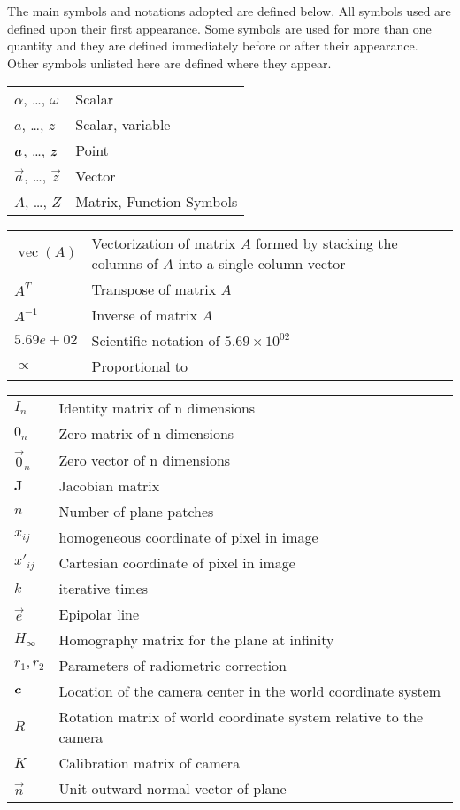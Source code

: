 
The main symbols and notations adopted are defined below. All symbols used are defined upon their first appearance. Some symbols are used for more than one quantity and they are defined immediately before or after their appearance. Other symbols unlisted here are defined where they appear.
 

\begin{tabular}{p{1.5cm} p{12cm}}
$\alpha$, \dots, $\omega$ & Scalar \\
$a$, \dots, $z$ & Scalar, variable\\
$\boldsymbol{a}$, \dots, $\boldsymbol{z}$ & Point \\
$\vec{a}$, \dots, $\vec{z}$ & Vector \\
$A$, \dots, $Z$ & Matrix, Function Symbols\\
\end{tabular}


\begin{tabular}{p{1.5cm} p{12cm}}
	$\operatorname {vec}(A)$ &  Vectorization of matrix $A$ formed by stacking the columns of $A$ into a single column vector\\
	$A^T$ &Transpose of matrix $A$ \\
	$A^{-1}$ & Inverse of matrix $A$\\
	$5.69e+02 $ & Scientific notation of $5.69 \times 10^{02}$\\
	$\propto $ & Proportional to
\end{tabular}


\begin{tabular}{p{1.5cm} p{12cm}}
$I_n$ & Identity matrix of n dimensions \\
$0_n$ & Zero matrix of n dimensions\\
$\vec{0}_{n}$ & Zero vector of n dimensions\\
$ \mathbf{J}$ & Jacobian matrix\\
$n$ &  Number of plane patches\\
$x_{ij}$ & homogeneous coordinate of pixel in image\\
$x'_{ij}$ & Cartesian coordinate of pixel in image\\
$k$ & iterative times\\
$\vec{e}$ & Epipolar line\\
$H_{\infty}$ &Homography matrix for the plane at infinity\\
$r_1,r_2$ & Parameters of radiometric correction\\
$\boldsymbol{c}$ &Location of the camera center in the world coordinate system\\
$R$&Rotation matrix of world coordinate system relative to the camera\\
$K$&Calibration matrix of camera\\
$\vec{n}$& Unit outward normal vector of plane\\
\end{tabular}
